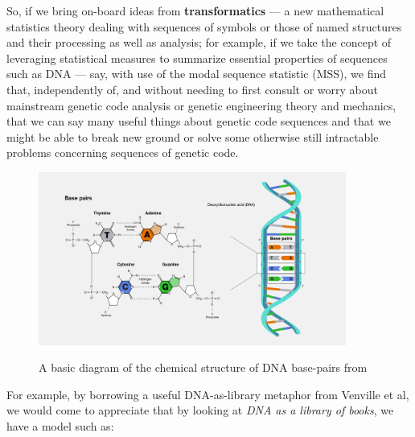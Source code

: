 \documentclass[a4paper, 18pt]{book} %
\begin{document}
So, if we bring on-board ideas from \textbf{transformatics}\cite{transformatics} --- a new mathematical statistics theory dealing with sequences of symbols or those of named structures and their processing as well as analysis; for example, if we take the concept of leveraging statistical measures to summarize essential properties of sequences such as DNA --- say, with use of the modal sequence statistic (MSS), we find that, independently of, and without needing to first consult or worry about mainstream genetic code analysis or genetic engineering theory and mechanics, that we can say many useful things about genetic code sequences and that we might be able to break new ground or solve some otherwise still intractable problems concerning sequences of genetic code.


\begin{figure}[H]
	\begin{center}
		\includegraphics[width=0.9\textwidth]{resources/images/dna_diagram.jpg} \\
		\caption{A basic diagram of the chemical structure of DNA base-pairs from \cite{wikipedia_basepair}}
		\label{FIG1}
\end{center}
\end{figure}
    


For example, by borrowing a useful DNA-as-library metaphor from Venville et al\cite{venville2006analogies}, we would come to appreciate that by looking at \textit{DNA as a library of books}, we have a model such as:
\end{document}
